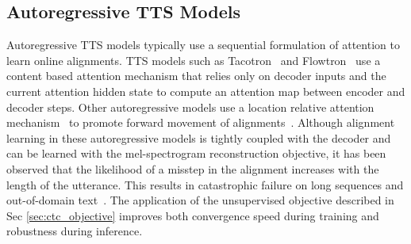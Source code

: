 \subsection{Autoregressive TTS Models}
\label{sec:autoregressive_alignment_framework}
Autoregressive TTS models typically use a sequential formulation of attention to learn online alignments. TTS models such as Tacotron~\cite{Tacotron} and Flowtron~\cite{Flowtron} use a content based attention mechanism that relies only on decoder inputs and the current attention hidden state to compute an attention map between encoder and decoder steps. Other autoregressive models use a location relative attention mechanism~\cite{locationattn} to promote forward movement of alignments~\cite{Tacotron2}. Although alignment learning in these autoregressive models is tightly coupled with the decoder and can be learned with the mel-spectrogram reconstruction objective, it has been observed that the likelihood of a misstep in the alignment increases with the length of the utterance. This results in catastrophic failure on long sequences and out-of-domain text~\cite{Battenberg}. The application of the unsupervised objective described in Sec \ref{sec:ctc_objective} improves both convergence speed during training and robustness during inference. 

